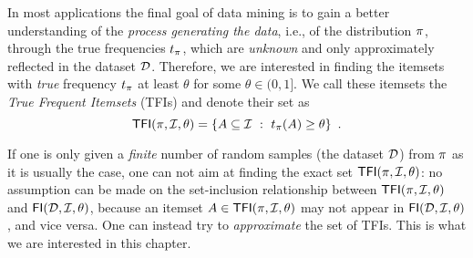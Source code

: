 In most applications the final goal of data mining is to gain a better
understanding of the \emph{process generating the data}, i.e., of the
distribution $\pi$, through the true frequencies $t_\pi$, which are
\emph{unknown} and only approximately reflected in the dataset ${\cal D}$. Therefore, %
we are interested in finding the itemsets with \emph{true} frequency
$t_\pi$ at least $\theta$ for some $\theta\in(0,1]$. We call these itemsets the
\emph{True Frequent Itemsets} (TFIs) and denote their set as %
\[
\mathsf{TFI}(\pi,{\cal I},\theta)=\{A\subseteq{\cal I} ~:~ t_\pi(A)\ge\theta\}\enspace.\]

If one is only given a \emph{finite} number of random
samples (the dataset ${\cal D}$) from $\pi$ as it is usually the case, one can not
aim at finding the exact set $\mathsf{TFI}(\pi,{\cal I},\theta)$: no assumption can be
made on the set-inclusion relationship between $\mathsf{TFI}(\pi,{\cal I},\theta)$ and
$\mathsf{FI}({\cal D},{\cal I},\theta)$,
because an itemset $A\in\mathsf{TFI}(\pi,{\cal I},\theta)$ may not appear in
$\mathsf{FI}({\cal D},{\cal I},\theta)$, and vice versa. One can instead try
to \emph{approximate} the set of TFIs. This is what we are interested in this
chapter.

